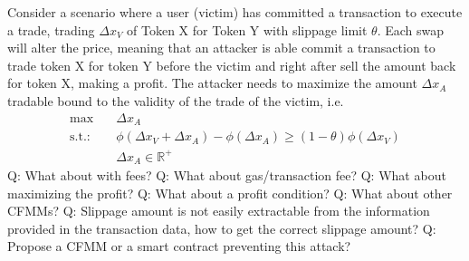 Consider a scenario where a user (victim) has committed a transaction to
execute a trade, trading $\Delta x_V$ of Token X for Token Y with slippage
limit $\theta$. Each swap will alter the price, meaning that an attacker is
able commit a transaction to trade token X for token Y before the victim and
right after sell the amount back for token X, making a profit. The attacker
needs to maximize the amount $\Delta x_A$ tradable bound to the validity of
the trade of the victim, i.e.
\begin{align}
    \max &\quad \Delta x_A \\
    \text{s.t.:}&\quad \phi(\Delta x_V + \Delta x_A) - \phi(\Delta x_A) \ge
    (1-\theta) \phi(\Delta x_V)\\
        &\quad \Delta x_A \in \mathbb{R}^{+}
\end{align}
Q: What about with fees?\newline
Q: What about gas/transaction fee?\newline
Q: What about maximizing the profit?\newline
Q: What about a profit condition?\newline
Q: What about other CFMMs?
Q: Slippage amount is not easily extractable from the information provided in
the transaction data, how to get the correct slippage amount?
Q: Propose a CFMM or a smart contract preventing this attack?
\newline

